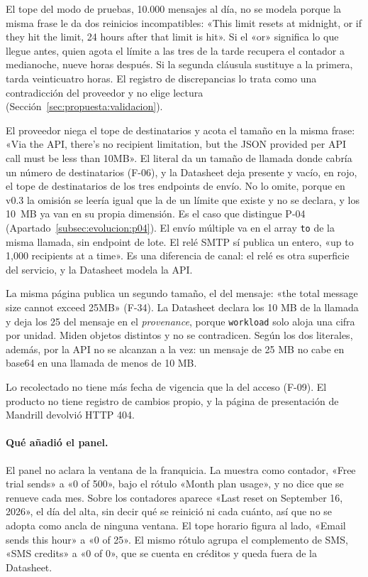 El tope del modo de pruebas, 10.000 mensajes al día, no se modela porque la misma
frase le da dos reinicios incompatibles: «This limit resets at midnight, or if they
hit the limit, 24 hours after that limit is hit». Si el «or» significa lo que llegue
antes, quien agota el límite a las tres de la tarde recupera el contador a
medianoche, nueve horas después. Si la segunda cláusula sustituye a la primera,
tarda veinticuatro horas. El registro de discrepancias lo trata como una
contradicción del proveedor y no elige lectura
(Sección~\ref{sec:propuesta:validacion}).

El proveedor niega el tope de destinatarios y acota el tamaño en la misma frase:
«Via the API, there's no recipient limitation, but the JSON provided per API call
must be less than 10MB». El literal da un tamaño de llamada donde cabría un número de
destinatarios (F-06), y la Datasheet deja presente y vacío, en rojo, el tope de
destinatarios de los tres endpoints de envío. No lo omite, porque en v0.3 la omisión se
leería igual que la de un límite que existe y no se declara, y los 10~MB ya van en su propia
dimensión. Es el caso que
distingue P-04 (Apartado~\ref{subsec:evolucion:p04}). El envío múltiple va en el array \texttt{to} de la misma
llamada, sin endpoint de lote. El relé SMTP sí publica un entero, «up to 1,000
recipients at a time». Es una diferencia de canal: el relé es otra superficie del
servicio, y la Datasheet modela la API.

La misma página publica un segundo tamaño, el del mensaje: «the total message size
cannot exceed 25MB» (F-34). La Datasheet declara los 10 MB de la llamada y deja
los 25 del mensaje en el \textit{provenance}, porque \texttt{workload} solo aloja una cifra por
unidad. Miden objetos distintos y no se contradicen. Según los dos literales, además,
por la API no se alcanzan a la vez: un mensaje de 25 MB no cabe en base64 en una
llamada de menos de 10 MB.

Lo recolectado no tiene más fecha de vigencia que la del acceso (F-09). El producto
no tiene registro de cambios propio, y la página de presentación de Mandrill devolvió
HTTP 404.

\paragraph{Qué añadió el panel.} El panel no aclara la ventana de la franquicia. La
muestra como contador, «Free trial sends» a «0 of 500», bajo el rótulo «Month plan
usage», y no dice que se renueve cada mes. Sobre los contadores aparece «Last reset
on September 16, 2026», el día del alta, sin decir qué se reinició ni cada cuánto,
así que no se adopta como ancla de ninguna ventana. El tope horario figura al lado,
«Email sends this hour» a «0 of 25». El mismo rótulo agrupa el complemento de SMS,
«SMS credits» a «0 of 0», que se cuenta en créditos y queda fuera de la Datasheet.

